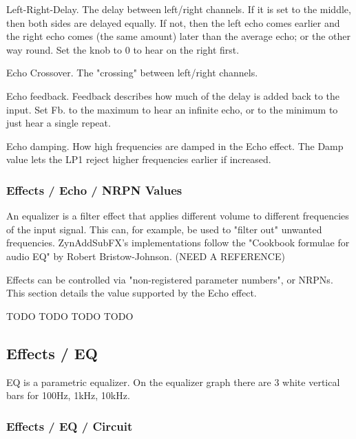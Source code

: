    Left-Right-Delay.
   The delay between left/right channels.
   If it is set to the middle, then both sides are delayed equally. If
   not, then the left echo comes earlier and the right echo comes (the
   same amount) later than the average echo; or the other way round.
   Set the knob to 0 to hear on the right first.

   Echo Crossover.
   The "crossing" between left/right channels.

   Echo feedback.
   Feedback describes how much of the delay is added back to the input.
   Set Fb. to the maximum to hear an infinite echo, or to the minimum to
   just hear a single repeat.

   Echo damping.
   How high frequencies are damped in the Echo effect.
   The Damp value lets the LP1 reject higher frequencies earlier if
   increased.

\subsubsection{Effects / Echo / NRPN Values}
\label{subsubsec:effects_edit_echo_nrpn}

   An equalizer is a filter effect that applies different volume to different
   frequencies of the input signal. This can, for example, be used to "filter
   out" unwanted frequencies. ZynAddSubFX’s implementations follow the
   "Cookbook formulae for audio EQ" by Robert Bristow-Johnson.
   (NEED A REFERENCE)

   Effects can be controlled via "non-registered parameter numbers", or NRPNs.
   This section details the value supported by the Echo effect.

   TODO
   TODO
   TODO
   TODO

\subsection{Effects / EQ}
\label{subsec:effects_edit_eq}

   EQ is a parametric equalizer. On the equalizer graph there are 3 white
   vertical bars for 100Hz, 1kHz, 10kHz.

\subsubsection{Effects / EQ / Circuit}
\label{subsubsec:effects_edit_eq_circuit}

